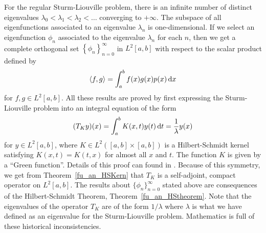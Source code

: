 For the regular Sturm-Liouville problem, there is an
infinite number of distinct eigenvalues
$\lambda_0 < \lambda_1 < \lambda_2 < \ldots$ converging to $+\infty$.
The subspace of all eigenfunctions associated to an eigenvalue $\lambda_n$
is one-dimensional.  If we select an eigenfunction $\phi_n$ associated
to the eigenvalue $\lambda_n$ for each $n$, then we get a complete
orthogonal set $\displaystyle \left\{\phi_n\right\}_{n=0}^\infty$ in
$\displaystyle L^2[a,b]$ with respect to the scalar product defined by
\[
  \left\langle{f} , {g}\right\rangle = \int_a^b f(x) g(x) p(x) \,\mathrm{d}{x}
\]
for $\displaystyle f, g \in L^2[a,b]$.  All these results are proved by first
expressing the Sturm-Liouville problem into an integral equation of
the form
\[
  (T_K y)(x) = \int_a^b K(x,t) y(t) \,\mathrm{d}{t} = \frac{1}{\lambda} y(x)
\]
for $\displaystyle y \in L^2[a,b]$, where
$\displaystyle K \in L^2([a,b]\times[a,b])$ is a
Hilbert-Schmidt kernel satisfying $K(x,t) = K(t,x)$ for almost all $x$
and $t$.  The function $K$ is given by a ``Green function''.
Details of this proof can found in \cite{RenRog}.  Because of
this symmetry, we get from Theorem~\ref{fu_an_HSKern} that
$T_K$ is a self-adjoint, compact operator on $\displaystyle L^2[a,b]$.  The
results about $\displaystyle \{\phi_n\}_{n=0}^\infty$ stated above are
consequences of the Hilbert-Schmidt Theorem,
Theorem~\ref{fu_an_HStheorem}.  Note that the eigenvalues of the
operator $T_K$ are of the form $1/\lambda$ where $\lambda$ is what we
have defined as an eigenvalue for the Sturm-Liouville problem.
Mathematics is full of these historical inconsistencies.

